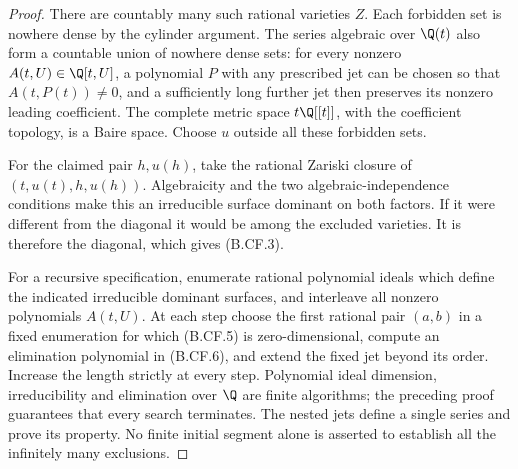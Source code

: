 \begin{proof}
There are countably many such rational varieties \(Z\). Each
forbidden set is nowhere dense by the cylinder argument. The series
algebraic over \(\Q(t)\) also form a countable union of nowhere dense
sets: for every nonzero \(A(t,U)\in\Q[t,U]\), a polynomial \(P\)
with any prescribed jet can be chosen so that \(A(t,P(t))\ne0\),
and a sufficiently long further jet then preserves its nonzero
leading coefficient. The complete metric space \(t\Q[[t]]\), with
the coefficient topology, is a Baire space. Choose \(u\) outside
all these forbidden sets.

For the claimed pair \(h,u(h)\), take the rational Zariski closure of
\((t,u(t),h,u(h))\). Algebraicity and the two algebraic-independence
conditions make this an irreducible surface dominant on both factors.
If it were different from the diagonal it would be among the excluded
varieties. It is therefore the diagonal, which gives (B.CF.3).

For a recursive specification, enumerate rational polynomial ideals
which define the indicated irreducible dominant surfaces, and
interleave all nonzero polynomials \(A(t,U)\). At each step choose
the first rational pair \((a,b)\) in a fixed enumeration for which
(B.CF.5) is zero-dimensional, compute an elimination polynomial in
(B.CF.6), and extend the fixed jet beyond its order. Increase the
length strictly at every step. Polynomial ideal dimension,
irreducibility and elimination over \(\Q\) are finite algorithms;
the preceding proof guarantees that every search terminates. The
nested jets define a single series and prove its property. No finite
initial segment alone is asserted to establish all the infinitely
many exclusions.
\end{proof}

